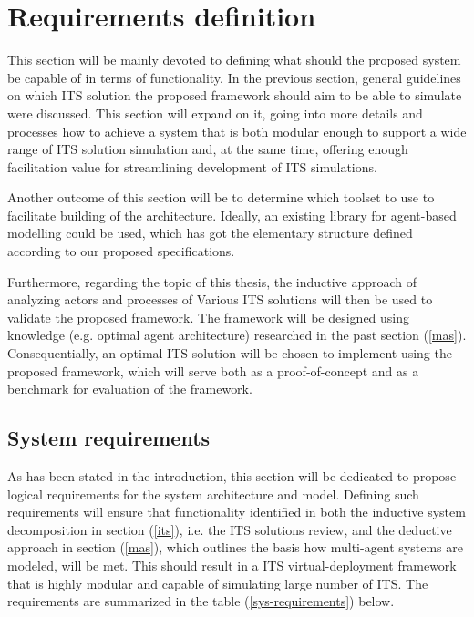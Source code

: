 \documentclass[main.tex]{subfiles}
\begin{document}
\section{Requirements definition}

This section will be mainly devoted to defining what should the proposed system be capable of in terms 
of functionality. In the previous section, general guidelines on which ITS solution the proposed 
framework should aim to be able to simulate were discussed. This section will expand on it, 
going into more details and processes how to achieve a system that is both modular enough to support 
a wide range of ITS solution simulation and, at the same time, offering enough facilitation value 
for streamlining development of ITS simulations. 

Another outcome of this section will be to determine which toolset to use to facilitate building of 
the architecture. Ideally, an existing library for agent-based modelling could be used, which has got 
the elementary structure defined according to our proposed specifications.

Furthermore, regarding the topic of this thesis, the inductive approach of analyzing actors and
processes of Various ITS solutions will then be used to validate the proposed framework. The
framework will be designed using knowledge (e.g. optimal agent architecture) researched in the
past section (\ref{mas}).  Consequentially, an optimal ITS solution will be chosen to implement
using the proposed framework, which will serve both as a proof-of-concept and as a benchmark
for evaluation of the framework.  

\subsection{System requirements}

As has been stated in the introduction, this section will be dedicated to propose logical
requirements for the system architecture and model. Defining such requirements will ensure that
functionality identified in both the inductive system decomposition in section (\ref{its}),
i.e. the ITS solutions review, and the deductive approach in section (\ref{mas}), which 
outlines the basis how multi-agent systems are modeled, will be met. This should result 
in a ITS virtual-deployment framework that is highly modular and capable of simulating large 
number of ITS. The requirements are summarized in the table (\ref{sys-requirements}) below.
\end{document}
